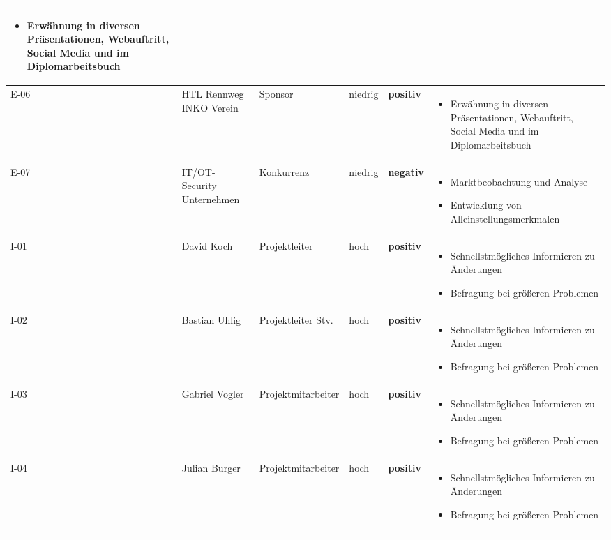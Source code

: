 \documentclass[
	headings=optiontotocandhead,%
	oneside,
	numbers=noenddot,%
	toc=flat, %
	10pt, %
	parskip=full, %
	listof=totoc, %
	listof=flat, %
	numbers=noenddot, %
	bibliography=totoc, %
	a4paper,DIV=14,
]{scrartcl}
\newcommand{\positiv}{\textbf{\textcolor[HTML]{00B050}{positiv}}}
\newcommand{\negativ}{\textbf{\textcolor[HTML]{FF0000}{negativ}}}
\newenvironment{myitemize}{
    \begin{itemize}[leftmargin=1.7em]
}{
    \end{itemize}
}
\begin{document}
\begin{longtable}{|M{1cm}|M{2.5cm}|M{3cm}|M{2cm}|M{2cm}|M{3.5cm}|}
\begin{myitemize}
	\item Erwähnung in diversen Präsentationen, Webauftritt, Social Media und im Diplomarbeitsbuch
	\end{myitemize} \\ \hline
E-06 & HTL Rennweg INKO Verein & Sponsor & niedrig & \positiv &
	\begin{myitemize}
	\item Erwähnung in diversen Präsentationen, Webauftritt, Social Media und im Diplomarbeitsbuch
	\end{myitemize} \\ \hline
E-07 & IT/OT-Security Unternehmen & Konkurrenz & niedrig & \negativ &
	\begin{myitemize}
    \item Marktbeobachtung und Analyse
    \item Entwicklung von Alleinstellungsmerkmalen
	\end{myitemize} \\ \hline
I-01 & David Koch & Projektleiter & hoch & \positiv & 
	\begin{myitemize}
	\item Schnellstmögliches Informieren zu Änderungen
	\item Befragung bei größeren Problemen
	\end{myitemize} \\ \hline
I-02 & Bastian Uhlig & Projektleiter Stv. & hoch & \positiv & 
	\begin{myitemize}
	\item Schnellstmögliches Informieren zu Änderungen
	\item Befragung bei größeren Problemen
	\end{myitemize} \\ \hline
I-03 & Gabriel Vogler & Projektmitarbeiter & hoch & \positiv & 
	\begin{myitemize}
	\item Schnellstmögliches Informieren zu Änderungen
	\item Befragung bei größeren Problemen
	\end{myitemize} \\ \hline
I-04 & Julian Burger & Projektmitarbeiter & hoch & \positiv & 
	\begin{myitemize}
	\item Schnellstmögliches Informieren zu Änderungen
	\item Befragung bei größeren Problemen
	\end{myitemize} \\ \hline




\end{longtable}
\end{document}
